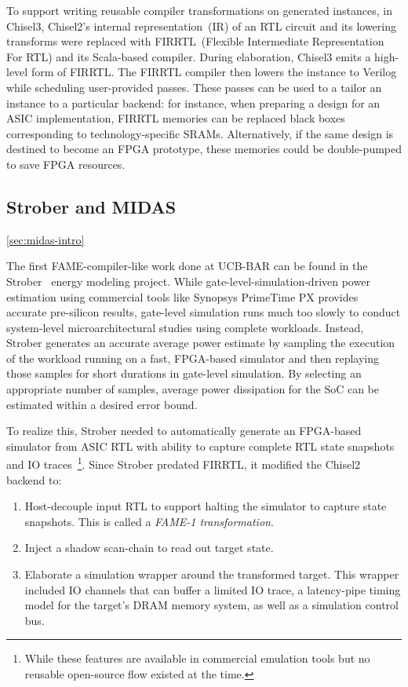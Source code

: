 To support writing reusable compiler transformations on generated instances, in
Chisel3, Chisel2's internal representation~(IR) of an RTL circuit and its
lowering transforms were replaced with FIRRTL~(Flexible Intermediate
Representation For RTL)\cite{FIRRTL} and its Scala-based compiler. During
elaboration, Chisel3 emits a high-level form of FIRRTL. The FIRRTL compiler
then lowers the instance to Verilog while scheduling user-provided passes. These passes can be used to
a tailor an instance to a particular backend: for instance, when preparing a
design for an ASIC implementation, FIRRTL memories can be replaced
black boxes corresponding to technology-specific SRAMs. Alternatively, if the same
design is destined to become an FPGA prototype, these memories could be double-pumped
to save FPGA resources.

\subsection{Strober and MIDAS}\ref{sec:midas-intro}

The first FAME-compiler-like work done at UCB-BAR can be found in the
Strober~\cite{Strober} energy modeling project. While
gate-level-simulation-driven power estimation using commercial tools like
Synopsys PrimeTime PX provides accurate pre-silicon results, gate-level
simulation runs much too slowly to conduct system-level microarchitectural studies using
complete workloads. Instead, Strober generates an accurate average power
estimate by sampling the execution of the workload running on a fast,
FPGA-based simulator and then replaying those samples for short durations in
gate-level simulation. By selecting an appropriate number of samples, average
power dissipation for the SoC can be estimated within a desired error bound.

To realize this, Strober needed to automatically generate an FPGA-based
simulator from ASIC RTL with ability to capture complete RTL state snapshots
and IO traces~\footnote{While these features are available in commercial
emulation tools but no reusable open-source flow existed at the time.}.
Since Strober predated FIRRTL, it modified the Chisel2 backend to:
\begin{enumerate}
    \item Host-decouple input RTL to support halting the simulator to capture
        state snapshots. This is called a \emph{FAME-1 transformation}.
    \item Inject a shadow scan-chain to read out target state.
    \item Elaborate a simulation wrapper around the transformed target. This
        wrapper included IO channels that can buffer a limited IO trace, a
        latency-pipe timing model for the target's DRAM memory system, as well
        as a simulation control bus.
\end{enumerate}

